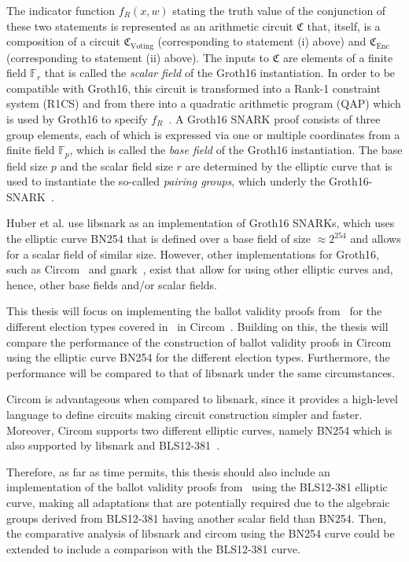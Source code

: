 \documentclass[12pt]{article}
\newcommand{\scalarfield}{\mathbb F_r}
\newcommand{\basefield}{\mathbb F_p}
\begin{document}
\noindent The indicator function $f_R(x,w)$ stating the truth value of the conjunction of these two statements is represented as an arithmetic circuit $\mathfrak C$ that, itself, is a composition of a circuit $\mathfrak{C}_{\text{Voting}}$ (corresponding to statement (i) above) and $\mathfrak{C}_{\text{Enc}}$ (corresponding to statement (ii) above). 
The inputs to $\mathfrak C$ are elements of a finite field $\scalarfield$ that is called the \emph{scalar field} of the Groth16 instantiation.
In order to be compatible with Groth16, this circuit is transformed into a Rank-1 constraint system (R1CS) and from there into a quadratic arithmetic program (QAP) which is used by Groth16 to specify $f_R$~\cite{BallotValidity,lambdaclass}.
A Groth16 SNARK proof consists of three group elements, each of which is expressed via one or multiple coordinates from a finite field $\basefield$, which is called the \emph{base field} of the Groth16 instantiation. 
The base field size $p$ and the scalar field size $r$ are determined by the elliptic curve that is used to instantiate the so-called \emph{pairing groups}, which underly the Groth16-SNARK~\cite{BallotValidity}.

Huber et al. use libsnark as an implementation of Groth16 SNARKs, which uses the elliptic curve BN254 that is defined over a base field of size $\approx 2^{254}$ and allows for a scalar field of similar size. 
However, other implementations for Groth16, such as Circom~\cite{circom} and gnark~\cite{gnark}, exist that allow for using other elliptic curves and, hence, other base fields and/or scalar fields.

This thesis will focus on implementing the ballot validity proofs from~\cite{BallotValidity} for the different election types covered in~\cite{BallotValidity} in Circom~\cite{circom}. 
Building on this, the thesis will compare the performance of the construction of ballot validity proofs in Circom using the elliptic curve BN254 for the different election types.
Furthermore, the performance will be compared to that of libsnark under the same circumstances.

Circom is advantageous when compared to libsnark, since it provides a high-level language to define circuits making circuit construction simpler and faster.
Moreover, Circom supports two different elliptic curves, namely BN254 which is also supported by libsnark and BLS12-381~\cite{circom}.

Therefore, as far as time permits, this thesis should also include an implementation of the ballot validity proofs from~\cite{BallotValidity} using the BLS12-381 elliptic curve, making all adaptations that are potentially required due to the algebraic groups derived from BLS12-381 having another scalar field than BN254. 
Then, the comparative analysis of libsnark and circom using the BN254 curve could be extended to include a comparison with the BLS12-381 curve.
\end{document}
